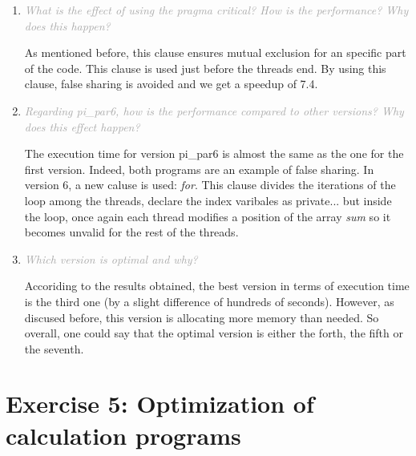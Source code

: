 \documentclass{article}
\newcommand{\greyItem}[1]{\item\emph{\textcolor{darkgray}{#1}}}
\begin{document}
\begin{enumerate}[label=4.\arabic*,leftmargin=*]
\greyItem{What is the effect of using the pragma critical? How is the performance? Why does this happen?}

As mentioned before, this clause ensures mutual exclusion for an specific part of the code. This clause is used just before the threads end. By using this clause, false sharing is avoided and we get a speedup of 7.4. 

\greyItem{Regarding pi\_par6, how is the performance compared to other versions? Why does this effect happen?}

The execution time for version pi\_par6 is almost the same as the one for the first version. Indeed, both programs are an example of false sharing. In version 6, a new caluse is used: \emph{for}. This clause divides the iterations of the loop among the threads, declare the index varibales as private... but inside the loop, once again each thread modifies a position of the array \emph{sum} so it becomes unvalid for the rest of the threads.

\greyItem{Which version is optimal and why?} 

Accoriding to the results obtained, the best version in terms of execution time is the third one (by a slight difference of hundreds of seconds). However, as discused before, this version is allocating more memory than needed. So overall, one could say that the optimal version is either the forth, the fifth or the seventh.

\end{enumerate}

\pagebreak

\section{Exercise 5: Optimization	of	calculation	programs}
\end{document}
